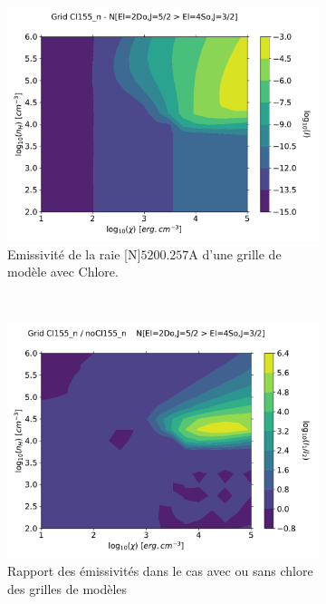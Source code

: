 \begin{figure}[!htbp]
    \centering
    \begin{subfigure}[t]{0.45\textwidth} %
        \centering \includegraphics[trim = {0 0 0 1.5cm},clip,width=1\textwidth]{figure/Cl/gridModelEmiss/mapI_N.pdf}
        \caption{Emissivité de la raie [N]$5200.257 \mathrm{A}$ d'une grille de modèle avec Chlore.}
    \end{subfigure}
    ~ 
    \begin{subfigure}[t]{0.45\textwidth} %
        \centering \includegraphics[trim = {0 0 0 1.5cm},clip,width=1\textwidth]{figure/Cl/gridModelEmiss/map_Cl155_n_noCl155_nI_N.pdf}
        \caption{Rapport des émissivités dans le cas avec ou sans chlore des grilles de modèles}
    \end{subfigure}
    
    \caption{}
    \label{fig:Cl:gridModelEmiss:N}
\end{figure}


